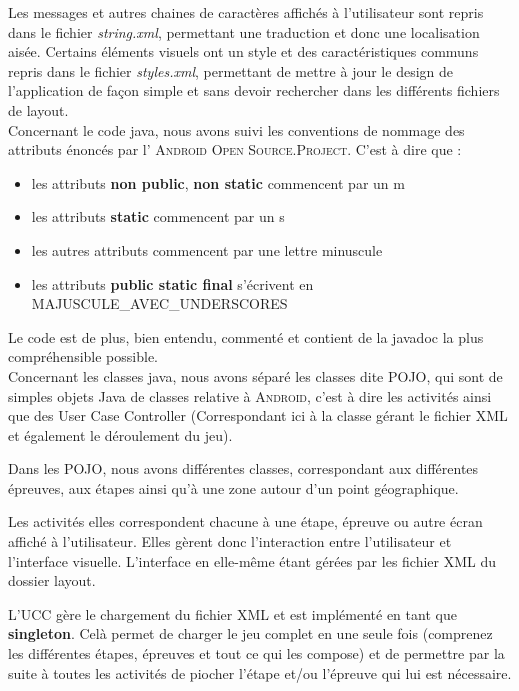 \documentclass[11pt]{scrreprt}
\begin{document}
    Les messages et autres chaines de caractères affichés à l'utilisateur sont repris dans le fichier \textit{string.xml}, permettant une traduction et donc une localisation aisée. Certains éléments visuels ont un style et des caractéristiques communs repris dans le fichier \textit{styles.xml}, permettant de mettre à jour le design de l'application de façon simple et sans devoir rechercher dans les différents fichiers de layout.\\

    Concernant le code java, nous avons suivi les conventions de nommage des attributs énoncés par l' \textsc{Android Open Source.Project}. C'est à dire que :
    \begin{itemize}
        \item les attributs \textbf{non public}, \textbf{non static} commencent par un m
        \item les attributs \textbf{static} commencent par un s
        \item les autres attributs commencent par une lettre minuscule
        \item les attributs \textbf{public static final} s'écrivent en MAJUSCULE\_AVEC\_UNDERSCORES
    \end{itemize}

    Le code est de plus, bien entendu, commenté et contient de la javadoc la plus compréhensible possible.\\

    Concernant les classes java, nous avons séparé les classes dite \og POJO\fg, qui sont de simples objets Java de classes relative à \textsc{Android}, c'est à dire les activités ainsi que des \og User Case Controller\fg{} (Correspondant ici à la classe gérant le fichier XML et également le déroulement du jeu).

    Dans les POJO, nous avons différentes classes, correspondant aux différentes épreuves, aux étapes ainsi qu'à une zone autour d'un point géographique.

    Les activités elles correspondent chacune à une étape, épreuve ou autre écran affiché à l'utilisateur. Elles gèrent donc l'interaction entre l'utilisateur et l'interface visuelle. L'interface en elle-même étant gérées par les fichier XML du dossier layout.

    L'UCC gère le chargement du fichier XML et est implémenté en tant que \textbf{singleton}. Celà permet de charger le jeu complet en une seule fois (comprenez les différentes étapes, épreuves et tout ce qui les compose) et de permettre par la suite à toutes les activités de piocher l'étape et/ou l'épreuve qui lui est nécessaire.
\end{document}
